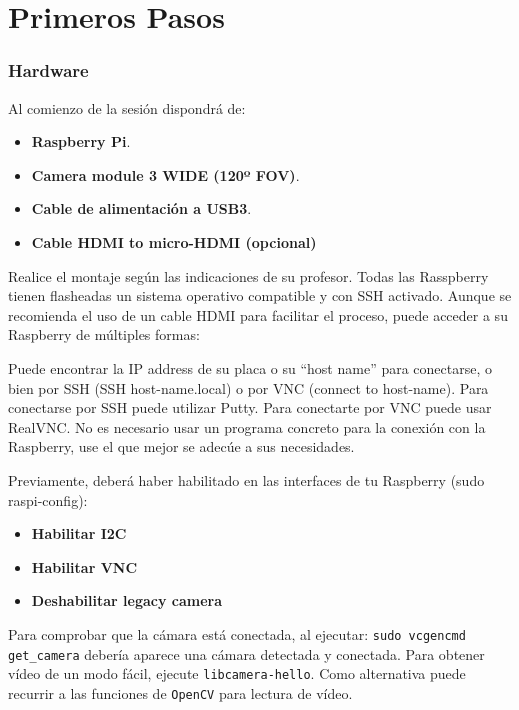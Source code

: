 \chapter{\textbf{Primeros Pasos}}
\label{chapter:primeros_pasos}

\subsection*{Hardware}
{}
\vspace{5mm}

Al comienzo de la sesión dispondrá de:

\begin{itemize}
    \item \textbf{Raspberry Pi}.
    \item \textbf{Camera module 3 WIDE (120º FOV)}.
    \item \textbf{Cable de alimentación a USB3}.
    \item \textbf{Cable HDMI to micro-HDMI (opcional)}
\end{itemize}

Realice el montaje según las indicaciones de su profesor. Todas las Rasspberry tienen flasheadas un sistema operativo compatible y con SSH activado. Aunque se recomienda el uso de un cable HDMI para facilitar el proceso, puede acceder a su Raspberry de múltiples formas:

Puede encontrar la IP address de su placa o su “host name” para conectarse, o bien por SSH (SSH host-name.local) o por VNC (connect to host-name). Para conectarse por SSH puede utilizar Putty. Para conectarte por VNC puede usar RealVNC. No es necesario usar un programa concreto para la conexión con la Raspberry, use el que mejor se adecúe a sus necesidades.

Previamente, deberá haber habilitado en las interfaces de tu Raspberry (sudo raspi-config):

\begin{itemize}
    \item \textbf{Habilitar I2C}
    \item \textbf{Habilitar VNC}
    \item \textbf{Deshabilitar legacy camera}
\end{itemize}

Para comprobar que la cámara está conectada, al ejecutar: \texttt{sudo vcgencmd get\_camera} debería aparece una cámara detectada y conectada.
Para obtener vídeo de un modo fácil, ejecute \texttt{libcamera-hello}. Como alternativa puede recurrir a las funciones de \texttt{OpenCV} para lectura de vídeo.

